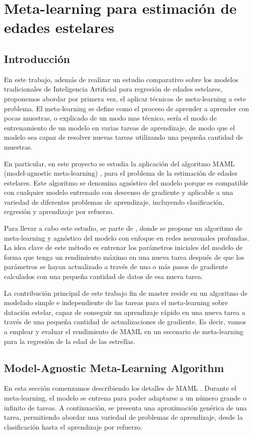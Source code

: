 \chapter{Meta-learning para estimación de edades estelares}

\section{Introducción}

En este trabajo, además de realizar un estudio comparativo sobre los modelos tradicionales de Inteligencia Artificial para regresión de edades estelares, proponemos abordar por primera vez, el aplicar técnicas de meta-learning a este problema. El meta-learning se define como el proceso de aprender a aprender con pocas muestras, o explicado de un modo mas técnico, sería el modo de entrenamiento de un modelo en varias tareas de aprendizaje, de modo que el modelo sea capaz de resolver nuevas tareas utilizando una pequeña cantidad de muestras. 

En particular, en este proyecto se estudia la aplicación del algoritmo MAML (model-agnostic meta-learning) \cite{finn2017modelagnostic}, para el problema de la estimación de edades estelares. Este algoritmo se denomina agnóstico del modelo porque es compatible con cualquier modelo entrenado con descenso de gradiente y aplicable a una variedad de diferentes problemas de aprendizaje, incluyendo clasificación, regresión y aprendizaje por refuerzo. 

Para llevar a cabo este estudio, se parte de \cite{finn2017modelagnostic}, donde se propone un algoritmo de meta-learning y agnóstico del modelo con enfoque en redes neuronales profundas. La idea clave de este método es entrenar los parámetros iniciales del modelo de forma que tenga un rendimiento máximo en una nueva tarea después de que los parámetros se hayan actualizado a través de uno o más pasos de gradiente calculados con una pequeña cantidad de datos de esa nueva tarea.

La contribución principal de este trabajo fin de master reside en un algoritmo de modelado simple e independiente de las tareas para el meta-learning sobre datación estelar, capaz de conseguir un aprendizaje rápido en una nueva tarea a través de una pequeña cantidad de actualizaciones de gradiente. Es decir, vamos a emplear y evaluar el rendimiento de MAML en un escenario de meta-learning para la regresión de la edad de las estrellas. 

\section{Model-Agnostic Meta-Learning Algorithm}
\label{sec:metalearning}
En esta sección comenzamos describiendo los detalles de MAML \cite{finn2017modelagnostic}. Durante el meta-learning, el modelo se entrena para poder adaptarse a un número grande o infinito de tareas. A continuación, se presenta una aproximación genérica de una tarea, permitiendo abordar una variedad de problemas de aprendizaje, desde la clasificación hasta el aprendizaje por refuerzo.


